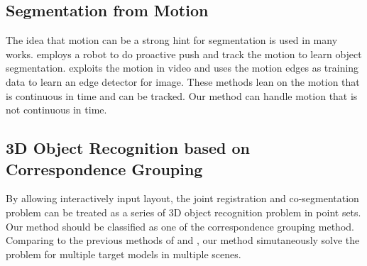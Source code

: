 \subsection{Segmentation from Motion}
The idea that motion can be a strong hint for segmentation is used in many works.\cite{Xu:2015:ACS:2816795.2818075} employs a robot to do proactive push and track the motion to learn object segmentation. \cite{unsupervisededge} exploits the motion in video and uses the motion edges as training data to learn an edge detector for image. These methods lean on the motion that is continuous in time and can be tracked. Our method can handle motion that is not continuous in time.

\subsection{3D Object Recognition based on Correspondence Grouping}
By allowing interactively input layout, the joint registration and co-segmentation problem can be treated as a series of 3D object recognition problem in point sets. Our method should be classified as one of the correspondence grouping method. Comparing to the previous methods of \cite{hough} and \cite{LOF}, our method simutaneously solve the problem for multiple target models in multiple scenes.